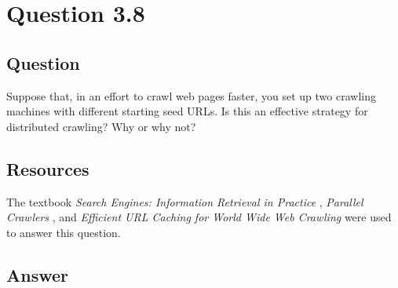\section{Question 3.8}

\subsection{Question}
Suppose that, in an effort to crawl web pages faster, you set up two crawling machines with different starting seed URLs. Is this an effective strategy for distributed crawling? Why or why not?

\subsection{Resources}
The textbook \textit{Search Engines: Information Retrieval in Practice} \cite{seirip}, \textit{Parallel Crawlers} \cite{Cho:2002:PC:511446.511464}, and \textit{Efficient URL Caching for World Wide Web Crawling} \cite{Broder:2003:EUC:775152.775247} were used to answer this question.


\subsection{Answer}

